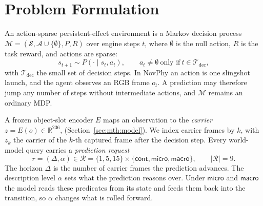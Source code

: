 \providecommand{\varnothing}{\emptyset}
\section{Problem Formulation}
\label{sec:mth:setting}

An action-sparse persistent-effect environment is a Markov decision process $\mathcal{M}=(\mathcal{S},\mathcal{A}\cup\{\varnothing\},P,R)$ over engine steps $t$, where $\varnothing$ is the null action, $R$ is the task reward, and actions are sparse:
\begin{equation}
s_{t+1}\sim P(\cdot\mid s_t,a_t),\qquad a_t\neq\varnothing\ \text{only if}\ t\in\mathcal{T}_{\mathrm{dec}},
\label{eq:mdp}
\end{equation}
with $\mathcal{T}_{\mathrm{dec}}$ the small set of decision steps. In NovPhy an action is one slingshot launch, and the agent observes an RGB frame $o_t$.  A prediction may therefore jump any number of steps without intermediate actions, and $\mathcal{M}$ remains an ordinary MDP. 

A frozen object-slot encoder $E$ maps an observation to the \emph{carrier} $z=E(o)\in\mathbb{R}^{236}$,  (Section~\ref{sec:mth:model}). We index carrier frames by $k$, with $z_k$ the carrier of the $k$-th captured frame after the decision step. Every world-model query carries a \emph{prediction request}
\begin{equation}
r=(\Delta,\alpha)\in\mathcal{R}=\{1,5,15\}\times\{\textsf{cont},\textsf{micro},\textsf{macro}\},\qquad|\mathcal{R}|=9 .
\label{eq:requests}
\end{equation}
The horizon $\Delta$ is the number of carrier frames the prediction advances. The description level $\alpha$ sets what the prediction reasons over.  Under $\textsf{micro}$ and $\textsf{macro}$ the model reads these predicates from its state and feeds them back into the transition, so $\alpha$ changes what is rolled forward. 

